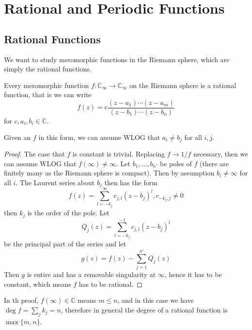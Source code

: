 \section{Rational and Periodic Functions}
\subsection{Rational Functions}
We want to study meromorphic functions in the Riemann sphere, which are simply the rational functions.
\begin{proposition}
    Every meromorphic function $f:\mathbb C_\infty\to\mathbb C_\infty$ on the Riemann sphere is a rational function, that is we can write
    $$f(z)=c\frac{(z-a_1)\cdots (z-a_m)}{(z-b_1)\cdots (z-b_n)}$$
    for $c,a_i,b_i\in\mathbb C$.
\end{proposition}
Given an $f$ in this form, we can assume WLOG that $a_i\neq b_j$ for all $i,j$.
\begin{proof}
    The case that $f$ is constant is trivial.
    Replacing $f\to 1/f$ necessary, then we can assume WLOG that $f(\infty)\neq\infty$.
    Let $b_1,\ldots,b_{n'}$ be poles of $f$ (there are finitely many as the Riemann sphere is compact).
    Then by assumption $b_i\neq\infty$ for all $i$.
    The Laurent series about $b_j$ then has the form
    $$f(z)=\sum_{l=-k_j}^\infty c_{j,l}(z-b_j)^l,c_{-k_j,j}\neq 0$$
    then $k_j$ is the order of the pole.
    Let
    $$Q_j(z)=\sum_{l=-k_j}^{-1} c_{j,l}(z-b_j)^l$$
    be the principal part of the series and let
    $$g(z)=f(z)-\sum_{j=1}^{n'}Q_j(z)$$
    Then $g$ is entire and has a removable singularity at $\infty$, hence it has to be constant, which means $f$ has to be rational.
\end{proof}
\begin{remark}
    In th proof, $f(\infty)\in\mathbb C$ means $m\le n$, and in this case we have $\deg f=\sum_jk_j=n$, therefore in general the degree of a rational function is $\max\{m,n\}$.
\end{remark}
